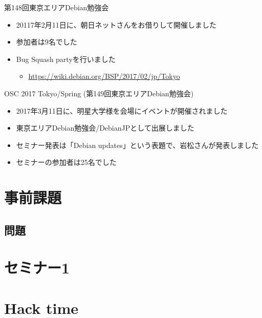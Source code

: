 \begin{frame}{第148回東京エリアDebian勉強会}
\begin{itemize}
\item 20117年2月11日に、朝日ネットさんをお借りして開催しました
\item 参加者は9名でした
\item Bug Squash partyを行いました
  \begin{itemize}
    \item \url{https://wiki.debian.org/BSP/2017/02/jp/Tokyo}
  \end{itemize}
\end{itemize} 
\end{frame}

\begin{frame}{OSC 2017 Tokyo/Spring (第149回東京エリアDebian勉強会)}
\begin{itemize}
\item 2017年3月11日に、明星大学様を会場にイベントが開催されました
\item 東京エリアDebian勉強会/DebianJPとして出展しました
\item セミナー発表は「Debian updates」という表題で、岩松さんが発表しました
\item セミナーの参加者は25名でした
\end{itemize} 
\end{frame}

\section{事前課題}
{\footnotesize
 
}

\subsection{問題}


\section{セミナー1}

\section{Hack time}

  
